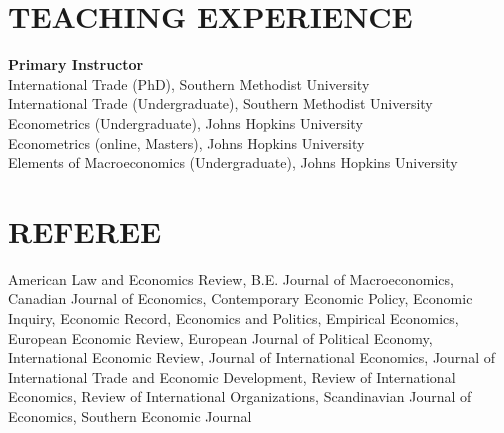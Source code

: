 \documentclass[11pt]{res}
\begin{document}
\begin{resume}
\section{TEACHING EXPERIENCE} \vspace{1.5mm}
{\bf Primary Instructor}\vspace{1.5mm}\\
International Trade (PhD), Southern Methodist University\vspace{1.5mm}\\
International Trade (Undergraduate), Southern Methodist University\vspace{1.5mm}\\
Econometrics (Undergraduate), Johns Hopkins University\vspace{1.5mm}\\
Econometrics (online, Masters), Johns Hopkins University\vspace{1.5mm}\\
Elements of Macroeconomics (Undergraduate), Johns Hopkins University\vspace{1.5mm}\\

\section{REFEREE} \vspace{1.5mm}
American Law and Economics Review, B.E. Journal of Macroeconomics, Canadian Journal of Economics, Contemporary Economic Policy, Economic Inquiry, 
Economic Record, Economics and Politics, Empirical Economics, European Economic Review, European Journal of Political Economy, International Economic Review, Journal of International Economics, Journal of International Trade and Economic Development, Review of International Economics, Review of International Organizations, Scandinavian Journal of Economics, Southern Economic Journal
\end{resume}
\end{document}
